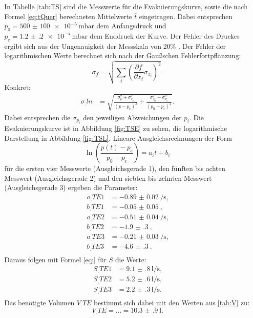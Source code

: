 In Tabelle \ref{tab:TS} sind die Messwerte für die Evakuierungskurve, sowie die nach Formel \eqref{eq:tQuer} berechneten Mittelwerte $\bar{t}$ eingetragen.
Dabei entsprechen $p_0=\SI{500(100)e-5}{\milli\bar}$ dem Anfangsdruck und $p_e=\SI{1.2(2)e-5}{\milli\bar}$ dem Enddruck der Kurve. Der Fehler des Druckes ergibt sich aus der Ungenauigkeit der Messskala von $20\%$ \cite{V70}. 
Der Fehler der logarithmischen Werte berechnet sich nach der Gaußschen Fehlerfortpflanzung:
\[
\sigma_f = \sqrt{\sum_i\left(\frac{\partial f}{\partial x_i}\sigma_{x_i}\right)^2}\text{.}
\]
Konkret:
\begin{align*}
\sigma_.{ln}	&=\sqrt{\frac{\sigma_p^2+\sigma_{p_e}^2}{(p-p_e)^2}+\frac{\sigma_{p_0}^2+\sigma_{p_e}^2}{(p_0-p_e)^2}}\text{.}
\end{align*}
Dabei entsprechen die $\sigma_{p_i}$ den jeweiligen Abweichungen der $p_i$.
Die Evakuierungskurve ist in Abbildung \ref{fig:TSE} zu sehen, die logarithmische Darstellung in Abbildung \ref{fig:TSL}.
Lineare Ausgleichsrechnungen der Form
\[
\ln\left(\frac{p(t)-p_e}{p_0-p_e}\right) = a_it+b_i
\]
für die ersten vier Messwerte (Ausgleichsgerade 1), den fünften bis achten Messwert (Ausgleichsgerade 2) und den siebten bis zehnten Messwert (Ausgleichsgerade 3) ergeben die Parameter:
\begin{align*}
a_.{TE1} &= \SI{-0.89(2)}{\per\second} \text{,}\\
b_.{TE1} &= \SI{-0.05(5)}{} \text{,}\\
a_.{TE2} &= \SI{-0.51(4)}{\per\second} \text{,}\\
b_.{TE2} &= \SI{-1.9(3)}{} \text{,}\\
a_.{TE3} &= \SI{-0.21(3)}{\per\second} \text{,}\\
b_.{TE3} &= \SI{-4.6(3)}{} \text{.}\\
\end{align*} 
Daraus folgen mit Formel \eqref{eq:} für $S$ die Werte:
\begin{align*}
S_.{TE1} &= \SI{9.1(8)}{\litre\per\second} \text{,}\\
S_.{TE2} &= \SI{5.2(6)}{\litre\per\second} \text{,}\\
S_.{TE3} &= \SI{2.2(3)}{\litre\per\second} \text{.}\\
\end{align*} 
Das benötigte Volumen $V_.{TE}$ bestimmt sich dabei mit den Werten aus \ref{tab:V} zu:
\[
V_.{TE} = \dots = \SI{10.3(9)}{\litre}\text{.}
\]


